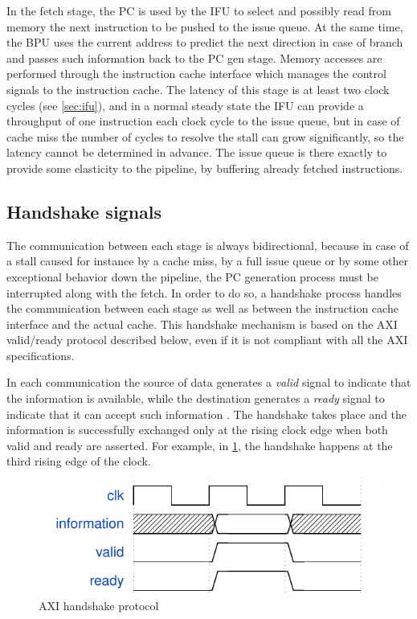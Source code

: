 In the fetch stage, the \ac{PC} is used by the \ac{IFU} to select and possibly read from memory the next instruction to be pushed to the issue queue. At the same time, the \ac{BPU} uses the current address to predict the next direction in case of branch and passes such information back to the \ac{PC} gen stage. Memory accesses are performed through the instruction cache interface which manages the control signals to the instruction cache. The latency of this stage is at least two clock cycles (see \cref{sec:ifu}), and in a normal steady state the \ac{IFU} can provide a throughput of one instruction each clock cycle to the issue queue, but in case of cache miss the number of cycles to resolve the stall can grow significantly, so the latency cannot be determined in advance. The issue queue is there exactly to provide some elasticity to the pipeline, by buffering already fetched instructions.

\subsection{Handshake signals}\label{sec:handshake}
The communication between each stage is always bidirectional, because in case of a stall caused for instance by a cache miss, by a full issue queue or by some other exceptional behavior down the pipeline, the \ac{PC} generation process must be interrupted along with the fetch. In order to do so, a handshake process handles the communication between each stage as well as between the instruction cache interface and the actual cache. This handshake mechanism is based on the {\smaller AXI} valid/ready protocol described below, even if it is not compliant with all the {\smaller AXI} specifications.

In each communication the source of data generates a \emph{valid} signal to indicate that the information is available, while the destination generates a \emph{ready} signal to indicate that it can accept such information \cite[p.~A3-41]{axi}. The handshake takes place and the information is successfully exchanged only at the rising clock edge when both valid and ready are asserted. For example, in \cref{fig:axi}, the handshake happens at the third rising edge of the clock.
\begin{figure}[hbt]
  \centering
  \includegraphics{img/axi.pdf}
  \caption{AXI handshake protocol}
  \label{fig:axi}
\end{figure}

